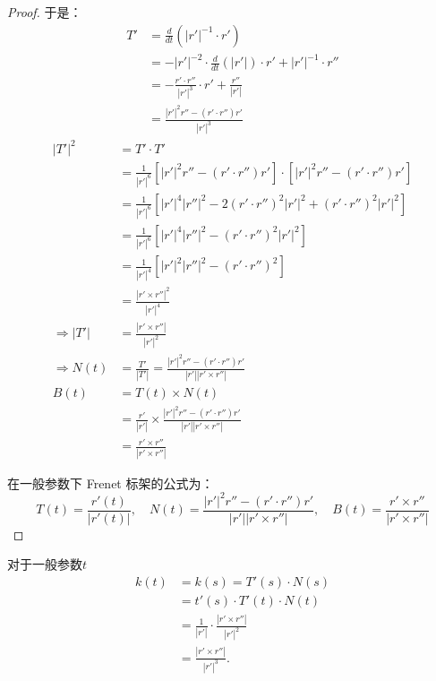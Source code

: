 \documentclass[lang=cn,10pt,thmcnt=section]{elegantbook}
\begin{document}
    \begin{proof}
    于是：
    \begin{align*}
        T' &= \frac{d}{dt} \left( |r'|^{-1} \cdot r' \right) \\
           &= -|r'|^{-2} \cdot \frac{d}{dt}(|r'|) \cdot r' + |r'|^{-1} \cdot r'' \\
           &= -\frac{r' \cdot r''}{|r'|^3} \cdot r' + \frac{r''}{|r'|} \\
           &= \frac{|r'|^2 r'' - (r' \cdot r'') r'}{|r'|^3}
        \end{align*}
        \begin{align*}
        |T'|^2 &= T' \cdot T' \\
              &= \frac{1}{|r'|^6} \left[ |r'|^2 r'' - (r' \cdot r'') r' \right] \cdot \left[ |r'|^2 r'' - (r' \cdot r'') r' \right] \\
              &= \frac{1}{|r'|^6} \left[ |r'|^4 |r''|^2 - 2 (r' \cdot r'')^2 |r'|^2 + (r' \cdot r'')^2 |r'|^2 \right] \\
              &= \frac{1}{|r'|^6} \left[ |r'|^4 |r''|^2 - (r' \cdot r'')^2 |r'|^2 \right] \\
              &= \frac{1}{|r'|^4} \left[ |r'|^2 |r''|^2 - (r' \cdot r'')^2 \right] \\
              &= \frac{|r' \times r''|^2}{|r'|^4}\\
              \Rightarrow |T'| &= \frac{|r' \times r''|}{|r'|^2} \\
        \Rightarrow N(t) &= \frac{T'}{|T'|} = \frac{|r'|^2 r'' - (r' \cdot r'') r'}{|r'| |r' \times r''|} \\
        B(t) &= T(t) \times N(t) \\
             &= \frac{r'}{|r'|} \times \frac{|r'|^2 r'' - (r' \cdot r'') r'}{|r'| |r' \times r''|} \\
             &= \frac{r' \times r''}{|r' \times r''|}
        \end{align*}

    在一般参数下 Frenet 标架的公式为：
\[
T(t) = \frac{r'(t)}{|r'(t)|}, \quad N(t) = \frac{|r'|^2 r'' - (r' \cdot r'') r'}{|r'| |r' \times r''|}, \quad B(t) = \frac{r' \times r''}{|r' \times r''|}
\]
\end{proof}
对于一般参数$t$
\begin{align*}
    k(t) &= k(s) = T'(s) \cdot N(s) \\
    &= t'(s) \cdot T'(t) \cdot N(t) \\
    &= \frac{1}{|r'|} \cdot \frac{|r' \times r''|}{|r'|^2} \\
    &= \frac{|r' \times r''|}{|r'|^3}.
\end{align*}
\end{document}

